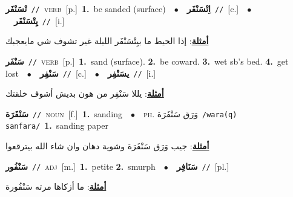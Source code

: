 \documentclass[10pt,a4paper,twoside]{article} %
\begin{document}
\begin{multicols}{2}
{\setlength\topsep{0pt}\textbf{\foreignlanguage{arabic}{تْسَنْفَر}}\ {\color{gray}\texttt{//}\color{black}}\ \textsc{verb}\ [p.]\ \textbf{1.}~be sanded (surface)\ \ $\bullet$\ \ \setlength\topsep{0pt}\textbf{\foreignlanguage{arabic}{اِتْسَنْفَر}}\ {\color{gray}\texttt{//}\color{black}}\ [c.]\ \ $\bullet$\ \ \setlength\topsep{0pt}\textbf{\foreignlanguage{arabic}{يِتْسَنْفَر}}\ {\color{gray}\texttt{//}\color{black}}\ [i.]\  \begin{flushright}\color{gray}\foreignlanguage{arabic}{\textbf{\underline{\foreignlanguage{arabic}{أمثلة}}}: إذا الحيط ما بيِتْسَنْفَر الليلة غير تشوف شي مايعجبك}\end{flushright}\color{black}} \vspace{2mm}

{\setlength\topsep{0pt}\textbf{\foreignlanguage{arabic}{سَنْفَر}}\ {\color{gray}\texttt{//}\color{black}}\ \textsc{verb}\ [p.]\ \textbf{1.}~sand (surface).  \textbf{2.}~be coward.  \textbf{3.}~wet sb's bed.  \textbf{4.}~get lost\ \ $\bullet$\ \ \setlength\topsep{0pt}\textbf{\foreignlanguage{arabic}{سَنْفِر}}\ {\color{gray}\texttt{//}\color{black}}\ [c.]\ \ $\bullet$\ \ \setlength\topsep{0pt}\textbf{\foreignlanguage{arabic}{يسَنْفِر}}\ {\color{gray}\texttt{//}\color{black}}\ [i.]\  \begin{flushright}\color{gray}\foreignlanguage{arabic}{\textbf{\underline{\foreignlanguage{arabic}{أمثلة}}}: يللا سَنْفِر من هون بديش أشوف خلقتك}\end{flushright}\color{black}} \vspace{2mm}

{\setlength\topsep{0pt}\textbf{\foreignlanguage{arabic}{سَنْفَرَة}}\ {\color{gray}\texttt{//}\color{black}}\ \textsc{noun}\ [f.]\ \textbf{1.}~sanding\ \ $\bullet$\ \ \textsc{ph.} \color{gray} \foreignlanguage{arabic}{وَرَق سَنْفَرَة}\color{black}\ {\color{gray}\texttt{/{\sffamily wara(q) sanfara}/}\color{black}}\ \textbf{1.}~sanding paper\  \begin{flushright}\color{gray}\foreignlanguage{arabic}{\textbf{\underline{\foreignlanguage{arabic}{أمثلة}}}: جيب وَرَق سَنْفَرَة وشوية دهان وان شاء الله بيترقعوا}\end{flushright}\color{black}} \vspace{2mm}

{\setlength\topsep{0pt}\textbf{\foreignlanguage{arabic}{سَنْفُور}}\ {\color{gray}\texttt{//}\color{black}}\ \textsc{adj}\ [m.]\ \textbf{1.}~petite  \textbf{2.}~smurph\ \ $\bullet$\ \ \setlength\topsep{0pt}\textbf{\foreignlanguage{arabic}{سَنَافِر}}\ {\color{gray}\texttt{//}\color{black}}\ [pl.]\  \begin{flushright}\color{gray}\foreignlanguage{arabic}{\textbf{\underline{\foreignlanguage{arabic}{أمثلة}}}: ما أزكاها مرته سَنْفُورة}\end{flushright}\color{black}} \vspace{2mm}


\end{multicols}
\end{document}
